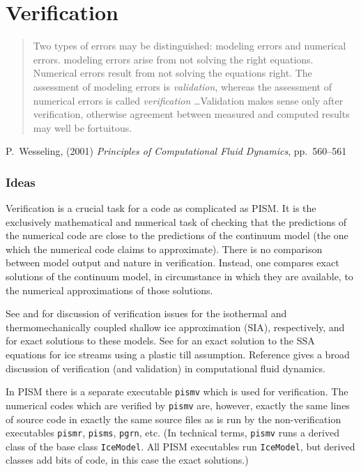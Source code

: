 \documentclass[11pt,final]{amsart}
\begin{document}
\clearpage\newpage
\section{Verification}\label{sect:verif}

\bigskip
\begin{quote}  Two types of errors may be distinguished: modeling errors and numerical errors.  modeling errors arise from not solving the right equations.  Numerical errors result from not solving the equations right.  The assessment of modeling errors is \emph{validation}, whereas the assessment of numerical errors is called \emph{verification} \dots  Validation makes sense only after verification, otherwise agreement between measured and computed results may well be fortuitous.
\end{quote}
\hfill P.~Wesseling, (2001)  \emph{Principles of Computational Fluid Dynamics}, pp.~560--561 \cite{Wesseling}
\bigskip

\subsubsection*{Ideas}  Verification is a crucial task for a code as complicated as PISM.  It is the exclusively mathematical and numerical task of checking that the predictions of the numerical code are close to the predictions of the continuum model (the one which the numerical code claims to approximate).  There is no comparison between model output and nature in verification.  Instead, one compares exact solutions of the continuum model, in circumstance in which they are available, to the numerical approximations of those solutions.

See \cite{BLKCB} and \cite{BBL} for discussion of verification issues for the isothermal and thermomechanically coupled shallow ice approximation (SIA), respectively, and for exact solutions to these models.  See \cite{SchoofStream} for an exact solution to the SSA equations for ice streams using a plastic till assumption.  Reference \cite{Roache} gives a broad discussion of verification (and validation) in computational fluid dynamics.

In PISM there is a separate executable \verb|pismv| which is used for verification.  The numerical codes which are verified by \verb|pismv| are, however, exactly the same lines of source code in exactly the same source files as is run by the non-verification executables \verb|pismr|, \verb|pisms|, \verb|pgrn|, etc.  (In technical terms, \verb|pismv| runs a derived class of the base class \verb|IceModel|.  All PISM executables run \verb|IceModel|, but derived classes add bits of code, in this case the exact solutions.)
\end{document}

